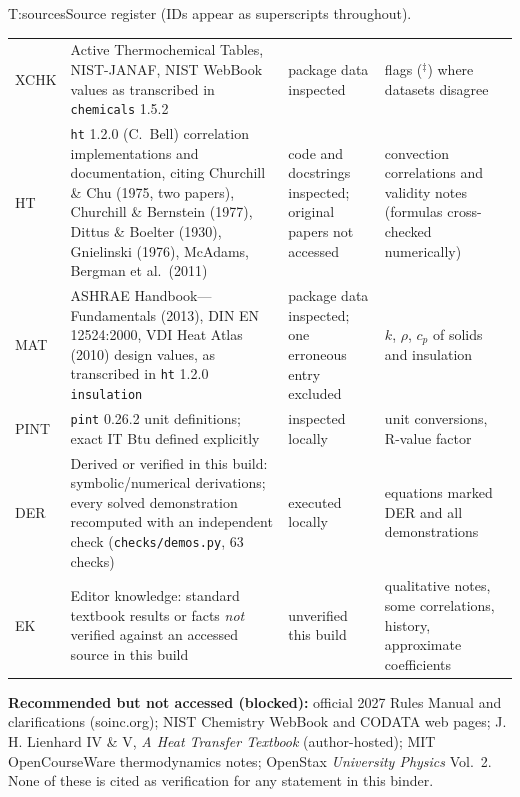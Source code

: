 \begin{reftab}{T:sources}{Source register (IDs appear as superscripts throughout).}
\begin{tabularx}{\textwidth}{@{}lL{0.42\textwidth}L{0.17\textwidth}Y@{}}
XCHK & Active Thermochemical Tables, NIST-JANAF, NIST WebBook values as transcribed in \texttt{chemicals} 1.5.2 & package data inspected & flags ($^\ddagger$) where datasets disagree\\
HT & \texttt{ht} 1.2.0 (C.\ Bell) correlation implementations and documentation, citing Churchill \& Chu (1975, two papers), Churchill \& Bernstein (1977), Dittus \& Boelter (1930), Gnielinski (1976), McAdams, Bergman et al.\ (2011) & code and docstrings inspected; original papers not accessed & convection correlations and validity notes (formulas cross-checked numerically)\\
MAT & ASHRAE Handbook---Fundamentals (2013), DIN EN 12524:2000, VDI Heat Atlas (2010) design values, as transcribed in \texttt{ht} 1.2.0 \texttt{insulation} & package data inspected; one erroneous entry excluded & $k$, $\rho$, $c_p$ of solids and insulation\\
PINT & \texttt{pint} 0.26.2 unit definitions; exact IT Btu defined explicitly & inspected locally & unit conversions, R-value factor\\
DER & Derived or verified in this build: symbolic/numerical derivations; every solved demonstration recomputed with an independent check (\texttt{checks/demos.py}, 63 checks) & executed locally & equations marked DER and all demonstrations\\
EK & Editor knowledge: standard textbook results or facts \emph{not} verified against an accessed source in this build & unverified this build & qualitative notes, some correlations, history, approximate coefficients\\
\bottomrule
\end{tabularx}\end{reftab}

\textbf{Recommended but not accessed (blocked):} official 2027 Rules Manual and clarifications (soinc.org); NIST Chemistry WebBook and CODATA web pages; J.\,H. Lienhard IV \& V, \emph{A Heat Transfer Textbook} (author-hosted); MIT OpenCourseWare thermodynamics notes; OpenStax \emph{University Physics} Vol.~2. None of these is cited as verification for any statement in this binder.
